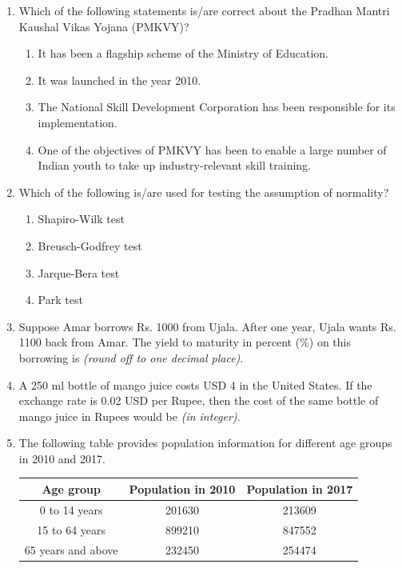 \documentclass[journal,13pt,onecolumn]{exam}
\theoremstyle{remark}
\begin{document}
\begin{enumerate}[label=Q.\arabic*]
\item Which of the following statements is/are correct about the Pradhan Mantri Kaushal Vikas Yojana (PMKVY)?
    \begin{enumerate}[label=\textbf{(\Alph*)}]
        \item It has been a flagship scheme of the Ministry of Education.
        \item It was launched in the year 2010.
        \item The National Skill Development Corporation has been responsible for its implementation.
        \item One of the objectives of PMKVY has been to enable a large number of Indian youth to take up industry-relevant skill training.
    \end{enumerate}
\item Which of the following is/are used for testing the assumption of normality?
    \begin{enumerate}[label=\textbf{(\Alph*)}]
        \item Shapiro-Wilk test
        \item Breusch-Godfrey test
        \item Jarque-Bera test
        \item Park test
    \end{enumerate}

\item Suppose Amar borrows Rs. 1000 from Ujala. After one year, Ujala wants Rs. 1100 back from Amar. The yield to maturity in percent (\%) on this borrowing is \underline{\hspace{2cm}} \textit{(round off to one decimal place)}.

\item A 250 ml bottle of mango juice costs USD 4 in the United States. If the exchange rate is 0.02 USD per Rupee, then the cost of the same bottle of mango juice in Rupees would be \underline{\hspace{2cm}} \textit{(in integer)}.

\item The following table provides population information for different age groups in 2010 and 2017.

\bigskip

\begin{tabular}{|c|c|c|}
\hline
\textbf{Age group} & \textbf{Population in 2010} & \textbf{Population in 2017} \\
\hline
0 to 14 years & 201630 & 213609 \\
\hline
15 to 64 years & 899210 & 847552 \\
\hline
65 years and above & 232450 & 254474 \\
\hline
\end{tabular}


\end{enumerate}
\end{document}
